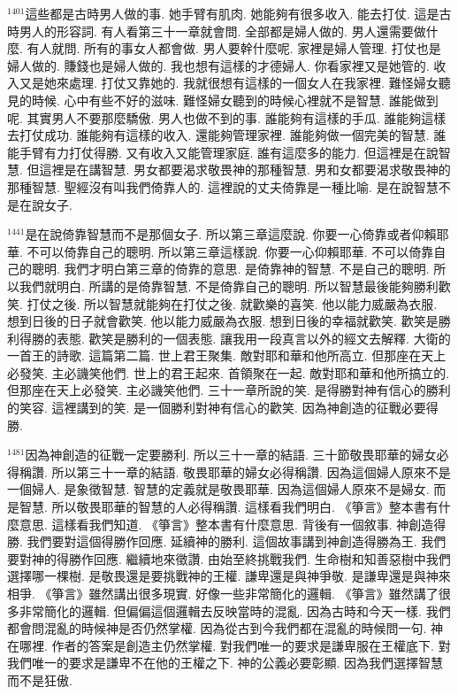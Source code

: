 \documentclass{book}
\begin{document}
$^{1401}$這些都是古時男人做的事.
她手臂有肌肉.
她能夠有很多收入.
能去打仗.
這是古時男人的形容詞.
有人看第三十一章就會問.
全部都是婦人做的.
男人還需要做什麼.
有人就問.
所有的事女人都會做.
男人要幹什麼呢.
家裡是婦人管理.
打仗也是婦人做的.
賺錢也是婦人做的.
我也想有這樣的才德婦人.
你看家裡又是她管的.
收入又是她來處理.
打仗又靠她的.
我就很想有這樣的一個女人在我家裡.
難怪婦女聽見的時候.
心中有些不好的滋味.
難怪婦女聽到的時候心裡就不是智慧.
誰能做到呢.
其實男人不要那麼驕傲.
男人也做不到的事.
誰能夠有這樣的手瓜.
誰能夠這樣去打仗成功.
誰能夠有這樣的收入.
還能夠管理家裡.
誰能夠做一個完美的智慧.
誰能手臂有力打仗得勝.
又有收入又能管理家庭.
誰有這麼多的能力.
但這裡是在說智慧.
但這裡是在講智慧.
男女都要渴求敬畏神的那種智慧.
男和女都要渴求敬畏神的那種智慧.
聖經沒有叫我們倚靠人的.
這裡說的丈夫倚靠是一種比喻.
是在說智慧不是在說女子.

$^{1441}$是在說倚靠智慧而不是那個女子.
所以第三章這麼說.
你要一心倚靠或者仰賴耶華.
不可以倚靠自己的聰明.
所以第三章這樣說.
你要一心仰賴耶華.
不可以倚靠自己的聰明.
我們才明白第三章的倚靠的意思.
是倚靠神的智慧.
不是自己的聰明.
所以我們就明白.
所講的是倚靠智慧.
不是倚靠自己的聰明.
所以智慧最後能夠勝利歡笑.
打仗之後.
所以智慧就能夠在打仗之後.
就歡樂的喜笑.
他以能力威嚴為衣服.
想到日後的日子就會歡笑.
他以能力威嚴為衣服.
想到日後的幸福就歡笑.
歡笑是勝利得勝的表態.
歡笑是勝利的一個表態.
讓我用一段真言以外的經文去解釋.
大衛的一首王的詩歌.
這篇第二篇.
世上君王聚集.
敵對耶和華和他所高立.
但那座在天上必發笑.
主必譏笑他們.
世上的君王起來.
首領聚在一起.
敵對耶和華和他所搞立的.
但那座在天上必發笑.
主必譏笑他們.
三十一章所說的笑.
是得勝對神有信心的勝利的笑容.
這裡講到的笑.
是一個勝利對神有信心的歡笑.
因為神創造的征戰必要得勝.

$^{1481}$因為神創造的征戰一定要勝利.
所以三十一章的結語.
三十節敬畏耶華的婦女必得稱讚.
所以第三十一章的結語.
敬畏耶華的婦女必得稱讚.
因為這個婦人原來不是一個婦人.
是象徵智慧.
智慧的定義就是敬畏耶華.
因為這個婦人原來不是婦女.
而是智慧.
所以敬畏耶華的智慧的人必得稱讚.
這樣看我們明白.
《箏言》整本書有什麼意思.
這樣看我們知道.
《箏言》整本書有什麼意思.
背後有一個敘事.
神創造得勝.
我們要對這個得勝作回應.
延續神的勝利.
這個故事講到神創造得勝為王.
我們要對神的得勝作回應.
繼續地來徵讚.
由始至終挑戰我們.
生命樹和知善惡樹中我們選擇哪一棵樹.
是敬畏還是要挑戰神的王權.
謙卑還是與神爭敬.
是謙卑還是與神來相爭.
《箏言》雖然講出很多現實.
好像一些非常簡化的邏輯.
《箏言》雖然講了很多非常簡化的邏輯.
但偏偏這個邏輯去反映當時的混亂.
因為古時和今天一樣.
我們都會問混亂的時候神是否仍然掌權.
因為從古到今我們都在混亂的時候問一句.
神在哪裡.
作者的答案是創造主仍然掌權.
對我們唯一的要求是謙卑服在王權底下.
對我們唯一的要求是謙卑不在他的王權之下.
神的公義必要彰顯.
因為我們選擇智慧而不是狂傲.
\end{document}
